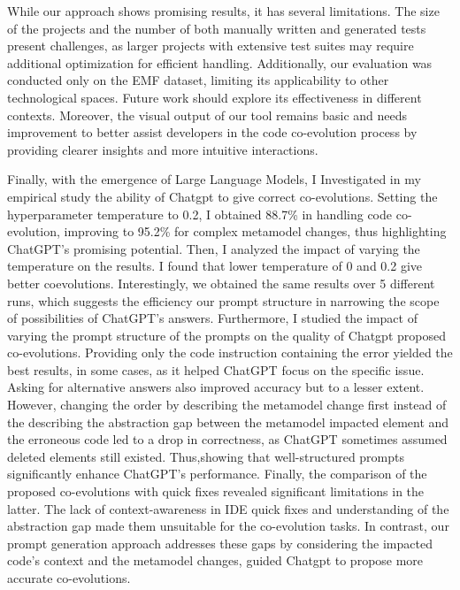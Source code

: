 While our approach shows promising results, it has several limitations. The size of the projects and the number of both manually written and generated tests present challenges, as larger projects with extensive test suites may require additional optimization for efficient handling. Additionally, our evaluation was conducted only on the EMF dataset, limiting its applicability to other technological spaces. Future work should explore its effectiveness in different contexts. Moreover, the visual output of our tool remains basic and needs improvement to better assist developers in the code co-evolution process by providing clearer insights and more intuitive interactions.

Finally, with the emergence of Large Language Models, I Investigated in my empirical study the ability of Chatgpt to give correct co-evolutions. Setting the hyperparameter temperature to 0.2, I obtained  88.7\% in handling code co-evolution, improving to 95.2\% for complex metamodel changes, thus highlighting ChatGPT’s promising potential. Then, I analyzed the impact of varying the temperature on the results. I found that lower temperature of 0 and 0.2 give better coevolutions. Interestingly, we obtained the same results over 5 different runs, which suggests the efficiency our
prompt structure in narrowing the scope of possibilities of ChatGPT’s answers. Furthermore, I studied the impact of varying the prompt structure of the prompts on the quality of Chatgpt proposed co-evolutions. Providing only the code instruction containing the error yielded the best results, in some cases, as it helped ChatGPT focus on the specific issue. Asking for alternative answers also improved accuracy but to a lesser extent. However, changing the order by describing the metamodel change first instead of the describing the abstraction gap between the metamodel impacted element and the erroneous code led to a drop in correctness, as ChatGPT sometimes assumed deleted elements still existed. Thus,showing that well-structured prompts significantly enhance ChatGPT’s performance. Finally, the comparison of the proposed co-evolutions with quick fixes revealed significant limitations in the latter. The lack of context-awareness in IDE quick fixes and understanding of the abstraction gap made them unsuitable for the co-evolution tasks. In contrast, our prompt generation approach addresses these gaps by considering the impacted code’s context and the metamodel changes, guided Chatgpt to propose more accurate co-evolutions.

